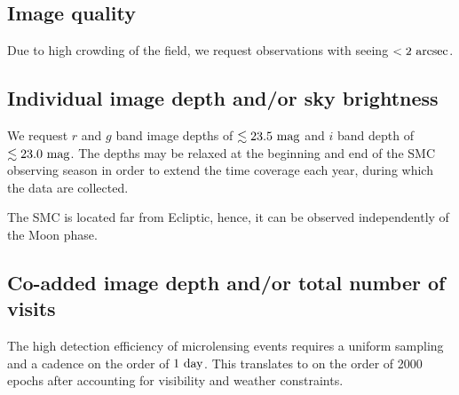 \documentclass[12pt,letterpaper]{article}
\begin{document}
\subsection{Image quality}

Due to high crowding of the field, we request observations with seeing $< 2~{\rm arcsec}$.


\subsection{Individual image depth and/or sky brightness}

We request $r$ and $g$ band image depths of $\lesssim23.5~{\rm mag}$ 
and $i$ band depth of $\lesssim23.0~{\rm mag}$.  
The depths may be relaxed at the beginning and end of the SMC observing season 
in order to extend the time coverage each year, during which the data are collected.

The SMC is located far from Ecliptic, hence, it can be observed 
independently of the Moon phase.


\subsection{Co-added image depth and/or total number of visits}

The high detection efficiency of microlensing events requires a uniform sampling and
a cadence on the order of $1~{\rm day}$.  This translates to on the order of
2000 epochs %
after accounting for visibility and weather constraints.
\end{document}
